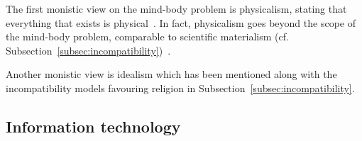 The first monistic view on the mind-body problem is physicalism, stating that everything that exists is physical~\cite{stoljar2010physicalism}. In fact, physicalism goes beyond the scope of the mind-body problem, comparable to scientific materialism (cf. Subsection~\ref{subsec:incompatibility})~\cite{Crane1990}.

Another monistic view is idealism which has been mentioned along with the incompatibility models favouring religion in Subsection~\ref{subsec:incompatibility}.
\lipsum[2]

\lipsum[2]



\subsection{Information technology}

